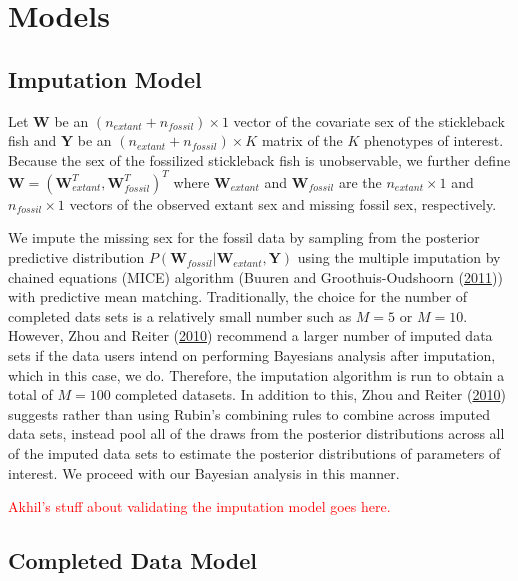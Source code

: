 \documentclass[
  12pt,
]{article}
\begin{document}
\hypertarget{sec:models}{%
\section{Models}\label{sec:models}}

\hypertarget{imputation-model}{%
\subsection{Imputation Model}\label{imputation-model}}

Let \(\boldsymbol{W}\) be an \((n_{extant} + n_{fossil}) \times 1\)
vector of the covariate sex of the stickleback fish and
\(\boldsymbol{Y}\) be an \((n_{extant} + n_{fossil}) \times K\) matrix
of the \(K\) phenotypes of interest. Because the sex of the fossilized
stickleback fish is unobservable, we further define
\(\boldsymbol{W} = (\boldsymbol{W}_{extant}^T,\boldsymbol{W}_{fossil}^T)^T\)
where \(\boldsymbol{W}_{extant}\) and \(\boldsymbol{W}_{fossil}\) are
the \(n_{extant} \times 1\) and \(n_{fossil} \times 1\) vectors of the
observed extant sex and missing fossil sex, respectively.

We impute the missing sex for the fossil data by sampling from the
posterior predictive distribution
\(P(\boldsymbol{W}_{fossil}|\boldsymbol{W}_{extant},\boldsymbol{Y})\)
using the multiple imputation by chained equations (MICE) algorithm
(Buuren and Groothuis-Oudshoorn (\protect\hyperlink{ref-MICE}{2011}))
with predictive mean matching. Traditionally, the choice for the number
of completed dats sets is a relatively small number such as \(M = 5\) or
\(M = 10\). However, Zhou and Reiter
(\protect\hyperlink{ref-ZhouReiter2010}{2010}) recommend a larger number
of imputed data sets if the data users intend on performing Bayesians
analysis after imputation, which in this case, we do. Therefore, the
imputation algorithm is run to obtain a total of \(M = 100\) completed
datasets. In addition to this, Zhou and Reiter
(\protect\hyperlink{ref-ZhouReiter2010}{2010}) suggests rather than
using Rubin's combining rules to combine across imputed data sets,
instead pool all of the draws from the posterior distributions across
all of the imputed data sets to estimate the posterior distributions of
parameters of interest. We proceed with our Bayesian analysis in this
manner.

\textcolor{red}{Akhil's stuff about validating the imputation model goes here.}

\hypertarget{completed-data-model}{%
\subsection{Completed Data Model}\label{completed-data-model}}
\end{document}
